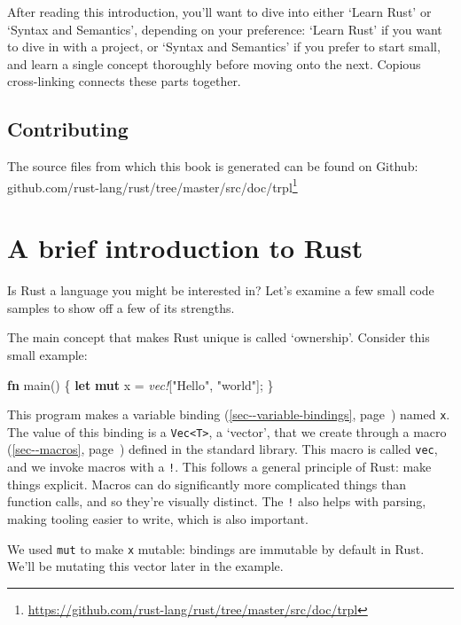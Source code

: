 \documentclass[a4paper,]{book}
\renewcommand*{\hyperref}[2][\ar]{%
  \def\ar{#2}%
  #2 (\autoref{#1}, page~\pageref{#1})}
\newenvironment{Shaded}{\begin{snugshade}}{\end{snugshade}}
\newcommand{\KeywordTok}[1]{\textcolor[rgb]{0.13,0.29,0.53}{\textbf{{#1}}}}
\newcommand{\StringTok}[1]{\textcolor[rgb]{0.31,0.60,0.02}{{#1}}}
\newcommand{\PreprocessorTok}[1]{\textcolor[rgb]{0.56,0.35,0.01}{\textit{{#1}}}}
\newcommand{\NormalTok}[1]{{#1}}
\renewcommand{\href}[2]{#2\footnote{\url{#1}}}
\begin{document}
After reading this introduction, you'll want to dive into either `Learn
Rust' or `Syntax and Semantics', depending on your preference: `Learn
Rust' if you want to dive in with a project, or `Syntax and Semantics'
if you prefer to start small, and learn a single concept thoroughly
before moving onto the next. Copious cross-linking connects these parts
together.

\subsection{Contributing}\label{contributing}

The source files from which this book is generated can be found on
Github:
\href{https://github.com/rust-lang/rust/tree/master/src/doc/trpl}{github.com/rust-lang/rust/tree/master/src/doc/trpl}

\section{A brief introduction to
Rust}\label{a-brief-introduction-to-rust}

Is Rust a language you might be interested in? Let's examine a few small
code samples to show off a few of its strengths.

The main concept that makes Rust unique is called `ownership'. Consider
this small example:

\begin{Shaded}
\begin{Highlighting}[]
\KeywordTok{fn} \NormalTok{main() \{}
    \KeywordTok{let} \KeywordTok{mut} \NormalTok{x = }\PreprocessorTok{vec!}\NormalTok{[}\StringTok{"Hello"}\NormalTok{, }\StringTok{"world"}\NormalTok{];}
\NormalTok{\}}
\end{Highlighting}
\end{Shaded}

This program makes a \hyperref[sec--variable-bindings]{variable binding}
named \texttt{x}. The value of this binding is a
\texttt{Vec\textless{}T\textgreater{}}, a `vector', that we create
through a \hyperref[sec--macros]{macro} defined in the standard library.
This macro is called \texttt{vec}, and we invoke macros with a
\texttt{!}. This follows a general principle of Rust: make things
explicit. Macros can do significantly more complicated things than
function calls, and so they're visually distinct. The \texttt{!} also
helps with parsing, making tooling easier to write, which is also
important.

We used \texttt{mut} to make \texttt{x} mutable: bindings are immutable
by default in Rust. We'll be mutating this vector later in the example.
\end{document}
